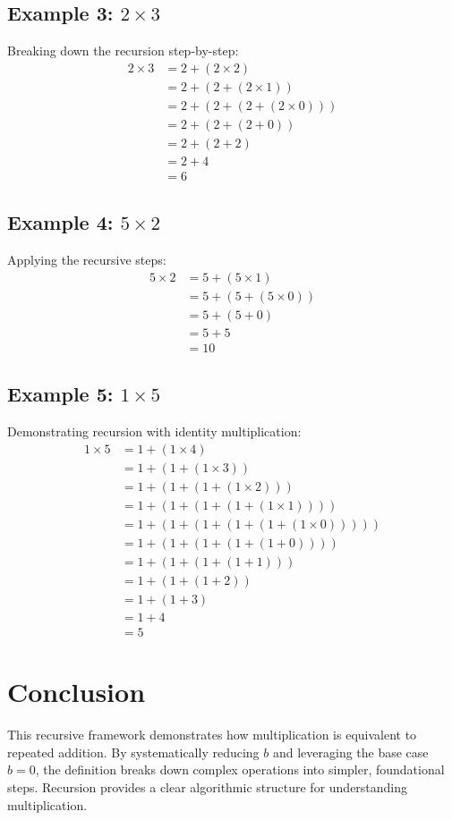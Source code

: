 \documentclass{article}
\begin{document}
\subsection{Example 3: \( 2 \times 3 \)}
Breaking down the recursion step-by-step:
\[
\begin{aligned}
2 \times 3 &= 2 + (2 \times 2) \\
&= 2 + (2 + (2 \times 1)) \\
&= 2 + (2 + (2 + (2 \times 0))) \\
&= 2 + (2 + (2 + 0)) \\
&= 2 + (2 + 2) \\
&= 2 + 4 \\
&= 6
\end{aligned}
\]

\subsection{Example 4: \( 5 \times 2 \)}
Applying the recursive steps:
\[
\begin{aligned}
5 \times 2 &= 5 + (5 \times 1) \\
&= 5 + (5 + (5 \times 0)) \\
&= 5 + (5 + 0) \\
&= 5 + 5 \\
&= 10
\end{aligned}
\]

\subsection{Example 5: \( 1 \times 5 \)}
Demonstrating recursion with identity multiplication:
\[
\begin{aligned}
1 \times 5 &= 1 + (1 \times 4) \\
&= 1 + (1 + (1 \times 3)) \\
&= 1 + (1 + (1 + (1 \times 2))) \\
&= 1 + (1 + (1 + (1 + (1 \times 1)))) \\
&= 1 + (1 + (1 + (1 + (1 + (1 \times 0))))) \\
&= 1 + (1 + (1 + (1 + (1 + 0)))) \\
&= 1 + (1 + (1 + (1 + 1))) \\
&= 1 + (1 + (1 + 2)) \\
&= 1 + (1 + 3) \\
&= 1 + 4 \\
&= 5
\end{aligned}
\]

\section{Conclusion}
This recursive framework demonstrates how multiplication is equivalent to repeated addition. By systematically reducing \( b \) and leveraging the base case \( b = 0 \), the definition breaks down complex operations into simpler, foundational steps. Recursion provides a clear algorithmic structure for understanding multiplication.
\end{document}
